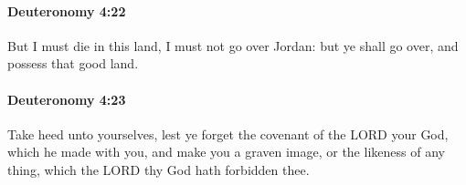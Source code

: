 		\paragraph{Deuteronomy 4:22} %
			\label{DEUTERONOMY-4-22}

			But I must die in this land, I must not go over Jordan: but ye shall go over, and possess that good land.


		\paragraph{Deuteronomy 4:23} %
			\label{DEUTERONOMY-4-23}

			Take heed unto yourselves, lest ye forget the covenant of the LORD your God, which he made with you, and make you a graven image, or the likeness of any thing, which the LORD thy God hath forbidden thee.



